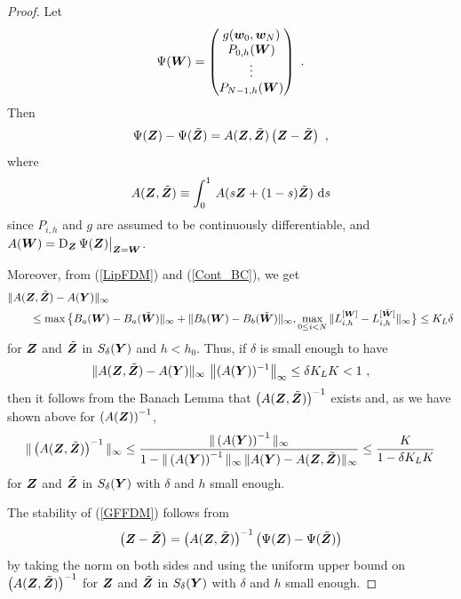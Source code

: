 \begin{proof}
Let
\begin{equation} \label{big_psi}
\Psi(\bm{W}) =\begin{pmatrix}
g(\bm{w}_0,\bm{w}_N) \\
P_{0,h}(\bm{W}) \\
\vdots \\
P_{N-1,h}(\bm{W}) \\
\end{pmatrix} \ .
\end{equation}
Then
\begin{equation} \label{FDM_int}
\Psi(\bm{Z}) - \Psi(\tilde{\bm{Z}}) = A(\bm{Z},\tilde{\bm{Z}})
\left(\bm{Z} - \tilde{\bm{Z}} \right) \ ,
\end{equation}
where
\[
A(\bm{Z}, \tilde{\bm{Z}}) \equiv \int_0^1\,
A(s \bm{Z} + (1-s)\tilde{\bm{Z}})\,\,\mathrm{d}s
\]
since $P_{i,h}$ and $g$ are assumed to be continuously
differentiable, and
$\displaystyle A(\bm{W})
= \operatorname{D}_{\bm{Z}} \Psi(\bm{Z})\big|_{\bm{Z} = \bm{W}}$.

Moreover, from (\ref{LipFDM}) and (\ref{Cont_BC}), we get
\begin{align*}
&\| A(\bm{Z},\tilde{\bm{Z}}) - A(\bm{Y}) \|_\infty \\
&\qquad \leq
\max \big\{ B_a(\bm{W}) - B_a(\tilde{\bm{W}}) \|_\infty +
\| B_b(\bm{W}) - B_b(\tilde{\bm{W}}) \|_\infty,
\max_{0\leq i <N}
\| L^{[\bm{W}]}_{i,h} - L^{[\tilde{\bm{W}}]}_{i,h} \|_\infty \big\}
\leq K_L \delta
\end{align*}
for $\bm{Z}$ and $\tilde{\bm{Z}}$ in
$S_\delta(\bm{Y})$ and $h<h_0$.  Thus, if $\delta$ is small enough to have
\[
  \| A(\bm{Z},\tilde{\bm{Z}}) - A(\bm{Y}) \|_\infty\,
\left\|(A(\bm{Y}))^{-1}\right\|_\infty
\leq \delta K_L K < 1 \ ,
\]
then it follows from the Banach Lemma that
$\displaystyle \left(A(\bm{Z},\tilde{\bm{Z}})\right)^{-1}$
exists and, as we have shown above for
$\displaystyle \left(A(\bm{Z})\right)^{-1}$,
\[
\| \left(A(\bm{Z},\tilde{\bm{Z}})\right)^{-1} \|_\infty \leq
\frac{\|\left(A(\bm{Y})\right)^{-1}\|_\infty}
{1-\|\left(A(\bm{Y})\right)^{-1}\|_\infty\,
\|A(\bm{Y}) - A(\bm{Z},\tilde{\bm{Z}})\|_\infty}
\leq \frac{K}{1-\delta K_L K}
\]
for $\bm{Z}$ and $\tilde{\bm{Z}}$ in $S_\delta(\bm{Y})$
with $\delta$ and $h$ small enough.

The stability of (\ref{GFFDM}) follows from
\[
\left(\bm{Z} - \tilde{\bm{Z}} \right) =
\left(A(\bm{Z},\tilde{\bm{Z}})\right)^{-1}
\left( \Psi(\bm{Z}) - \Psi(\tilde{\bm{Z}}) \right)
\]
by taking the norm on both sides and using the uniform upper bound on
$\displaystyle \left(A(\bm{Z},\tilde{\bm{Z}})\right)^{-1}$ for 
$\bm{Z}$ and $\tilde{\bm{Z}}$ in $S_\delta(\bm{Y})$
with $\delta$ and $h$ small enough.
\end{proof}

